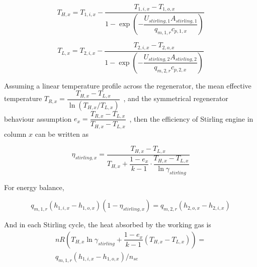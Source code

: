 \documentclass{article}
\begin{document}
\begin{equation*}
	T_{H,x}=T_{1,i,x}-\dfrac{T_{1,i,x}-T_{1,o,x}}{1-\exp(-\dfrac{U_{stirling,1}A_{stirling,1}}{q_{m,1,r}c_{p,1,x}})}\label{eq:T_H_x}
\end{equation*}


\begin{equation*}
	T_{L,x}=T_{2,i,x}-\dfrac{T_{2,i,x}-T_{2,o,x}}{1-\exp(-\dfrac{U_{stirling,2}A_{stirling,2}}{q_{m,2,r}c_{p,2,x}})}\label{eq:T_L_x}
\end{equation*}

Assuming a linear temperature profile across the regenerator, the mean effective temperature $T_{R,x}=\dfrac{T_{H,x}-T_{L,x}}{\ln(T_{H,x}/T_{L,x})}$~\cite{Der2007,Cavazzuti2012}, and the symmetrical regenerator behaviour assumption $e_{x}=\dfrac{T_{R,x}-T_{L,x}}{T_{H,x}-T_{L,x}}$~\cite{Formosa2010,Juhasz2010}, then the efficiency of Stirling engine in column $x$ can be written as~\cite{Stine1985,Goswami2015}

\begin{equation*}
	\eta_{stirling,x}=\dfrac{T_{H,x}-T_{L,x}}{T_{H,x}+\dfrac{1-e_{x}}{k-1}\cdot\dfrac{T_{H,x}-T_{L,x}}{\ln\gamma_{stirling}}}\label{eq:eta_striling_x}
\end{equation*}
%
%
%
%
%
%
%

For energy balance,

\begin{equation*}
	q_{m,1,r}(h_{1,i,x}-h_{1,o,x})(1-\eta_{stirling,x})=q_{m,2,r}(h_{2,o,x}-h_{2,i,x})
\end{equation*}

And in each Stirling cycle, the heat absorbed by the working gas is 
\begin{equation*}
\begin{split}
	nR\left(T_{H,x}\ln\gamma_{stirling}+\dfrac{1-e_{x}}{k-1}\left(T_{H,x}-T_{L,x}\right)\right)=\\q_{m,1,r}(h_{1,i,x}-h_{1,o,x})/n_{se}
\end{split}
\end{equation*}
\end{document}
